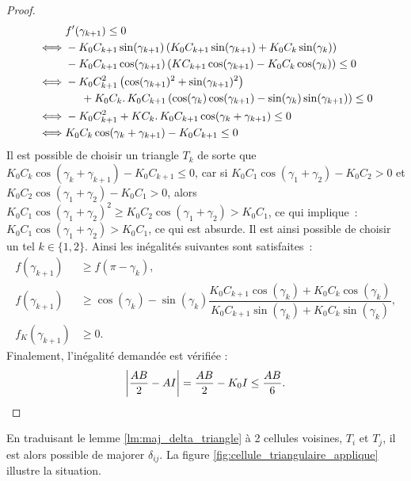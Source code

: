 \documentclass[12pt,a4paper]{article}
\begin{document}
\begin{proof}
		\[
			\begin{aligned}
				&f'(\gamma_{k+1}) \leq 0 \\
				\iff& -K_0C_{k+1}\sin(\gamma_{k+1})\left(K_0C_{k+1}\sin(\gamma_{k+1})+K_0C_k\sin(\gamma_k)\right)\\
				&- K_0C_{k+1}\cos(\gamma_{k+1})\left(KC_{k+1}\cos(\gamma_{k+1})-K_0C_k\cos(\gamma_k)\right) \leq 0\\
				\iff &-K_0C_{k+1}^2\left(\cos(\gamma_{k+1})^2+\sin(\gamma_{k+1})^2\right)\\
				& \hspace{.5cm}+ K_0C_k.\,K_0C_{k+1}\left(\cos(\gamma_k)\cos(\gamma_{k+1})-\sin(\gamma_k)\sin(\gamma_{k+1})\right) \leq 0\\
				\iff&-K_0C_{k+1}^2 + KC_k.\,K_0C_{k+1}\cos(\gamma_k+\gamma_{k+1}) \leq 0\\
				\iff&K_0C_k\cos(\gamma_k+\gamma_{k+1})-K_0C_{k+1} \leq 0
			\end{aligned}
		\]
		Il est possible de choisir un triangle $T_k$ de sorte que $K_0C_k\cos(\gamma_k+\gamma_{k+1})-K_0C_{k+1} \leq 0$, car si $K_0C_1\cos(\gamma_1+\gamma_2)-K_0C_2 > 0$ et $K_0C_2\cos(\gamma_1+\gamma_2)-K_0C_1 > 0$, alors $K_0C_1\cos(\gamma_1+\gamma_2)^2 \geq K_0C_2\cos(\gamma_1+\gamma_2) > K_0C_1$, ce qui implique : $K_0C_1\cos(\gamma_1+\gamma_2) > K_0C_1$, ce qui est absurde. Il est ainsi possible de choisir un tel $k \in \{1,2\}$. Ainsi les inégalités suivantes sont satisfaites :
		\[
			\begin{aligned}
				f(\gamma_{k+1}) &\geq f(\pi-\gamma_k),\\
				 f(\gamma_{k+1}) &\geq \cos(\gamma_k)-\sin(\gamma_k)\dfrac{K_0C_{k+1}\cos(\gamma_k)+K_0C_k\cos(\gamma_k)}{K_0C_{k+1}\sin(\gamma_k)+K_0C_k\sin(\gamma_k)},\\
				f_K(\gamma_{k+1}) &\geq 0.
			\end{aligned}
		\]
		Finalement, l'inégalité demandée est vérifiée :
		\[
			\left\lvert \frac{AB}2-AI \right\rvert = \dfrac{AB}2 - K_0I \leq \dfrac{AB}6.
		\]
	\end{proof}
	
	
	
	En traduisant le lemme \ref{lm:maj_delta_triangle} à 2 cellules voisines, $T_i$ et $T_j$, il est alors possible de majorer $\delta_{ij}$. La figure \ref{fig:cellule_triangulaire_applique} illustre la situation.
	
\end{document}
